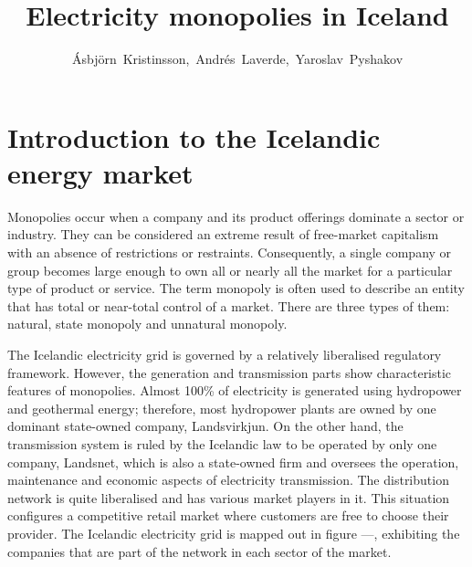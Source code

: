 \documentclass[svn, final]{rureport}
\author{Ásbjörn~Kristinsson,~Andrés~Laverde,~Yaroslav~Pyshakov}  %
\title{Electricity monopolies in Iceland}  %
\begin{document}
\maketitle  %
\listoffixmes{}

\section{Introduction to the Icelandic energy market}

Monopolies occur when a company and its product offerings dominate a sector or industry. They can be considered an extreme result of free-market capitalism with an absence of restrictions or restraints. Consequently, a single company or group becomes large enough to own all or nearly all the market for a particular type of product or service. The term monopoly is often used to describe an entity that has total or near-total control of a market. There are three types of them: natural, state monopoly and unnatural monopoly. 

The Icelandic electricity grid is governed by a relatively liberalised regulatory framework. However, the generation and transmission parts show characteristic features of monopolies. Almost 100\% of electricity is generated using hydropower and geothermal energy; therefore, most hydropower plants are owned by one dominant state-owned company, Landsvirkjun. On the other hand, the transmission system is ruled by the Icelandic law to be operated by only one company, Landsnet, which is also a state-owned firm and oversees the operation, maintenance and economic aspects of electricity transmission. The distribution network is quite liberalised and has various market players in it. This situation configures a competitive retail market where customers are free to choose their provider. The Icelandic electricity grid is mapped out in figure ---, exhibiting the companies that are part of the network in each sector of the market. 
\end{document}
